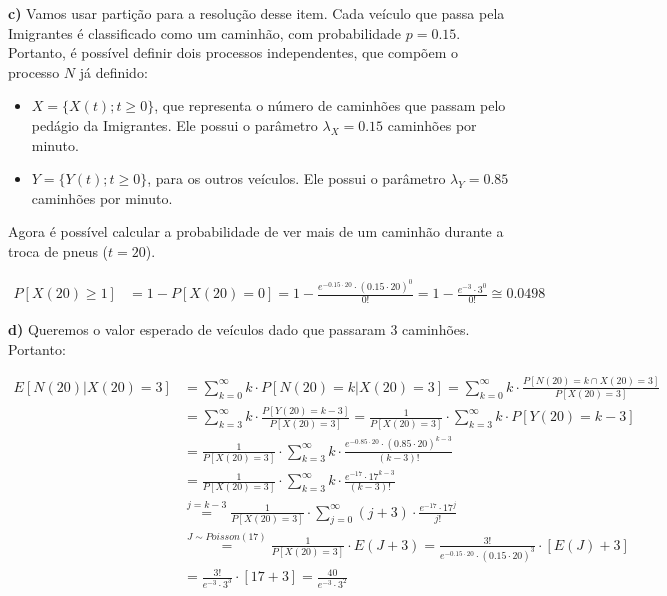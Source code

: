 \documentclass[12pt]{article}
\begin{document}
	 \textbf{c)} Vamos usar partição para a resolução desse item. Cada veículo que passa pela Imigrantes é classificado como um caminhão, com probabilidade $ p = 0.15 $. Portanto, é possível definir dois processos independentes, que compõem o processo $ N $ já definido:
	 
	 \begin{itemize}
	 	\item $ X = \{X(t); t\geq0\} $, que representa o número de caminhões que passam pelo pedágio da Imigrantes. Ele possui o parâmetro $\lambda_X = 0.15$ caminhões por minuto.
	 	\item $ Y = \{Y(t); t\geq0\} $, para os outros veículos. Ele possui o parâmetro $\lambda_Y = 0.85$ caminhões por minuto.
	 \end{itemize}
	 
	 Agora é possível calcular a probabilidade de ver mais de um caminhão durante a troca de pneus ($ t = 20 $).
	 
	 \begin{equation*}
		 \begin{split}
			 P[X(20) \geq 1] & = 1 - P[X(20) = 0] = 1 - \frac{e^{-0.15\cdot 20}\cdot(0.15\cdot 20)^0}{0!} = 1 - \frac{e^{-3}\cdot 3^0}{0!} \cong 0.0498
		 \end{split}
	 \end{equation*}
	 
	 \textbf{d)} Queremos o valor esperado de veículos dado que passaram 3 caminhões. Portanto:
	 
	 \begin{equation*}
		 \begin{split}
			 E[N(20) | X(20) = 3] & = \sum_{k=0}^{\infty} k \cdot P[N(20) = k | X(20) = 3] = \sum_{k=0}^{\infty} k \cdot \frac{P[N(20) = k \cap X(20) = 3]}{P[X(20) = 3]} \\
			 & = \sum_{k=3}^{\infty} k \cdot \frac{P[Y(20) = k-3]}{P[X(20) = 3]} = \frac{1}{P[X(20) = 3]} \cdot \sum_{k=3}^{\infty} k \cdot P[Y(20) = k-3] \\
			 & = \frac{1}{P[X(20) = 3]} \cdot \sum_{k=3}^{\infty} k \cdot \frac{e^{-0.85\cdot 20} \cdot (0.85\cdot 20)^{k-3}}{(k-3)!} \\
			 & = \frac{1}{P[X(20) = 3]} \cdot \sum_{k=3}^{\infty} k \cdot \frac{e^{-17} \cdot 17^{k-3}}{(k-3)!} \\
			 & \stackrel{j = k-3}{=} \frac{1}{P[X(20) = 3]} \cdot \sum_{j=0}^{\infty} (j+3) \cdot \frac{e^{-17} \cdot 17^j}{j!} \\
			 & \stackrel{J \sim Poisson(17)}{=} \frac{1}{P[X(20) = 3]} \cdot E(J+3) = \frac{3!}{e^{-0.15 \cdot 20}\cdot (0.15 \cdot 20)^3} \cdot [E(J) + 3] \\
			 & = \frac{3!}{e^{-3}\cdot 3^3} \cdot [17 + 3] = \frac{40}{e^{-3}\cdot 3^2}
		 \end{split}
	 \end{equation*}
	 
\end{document}
